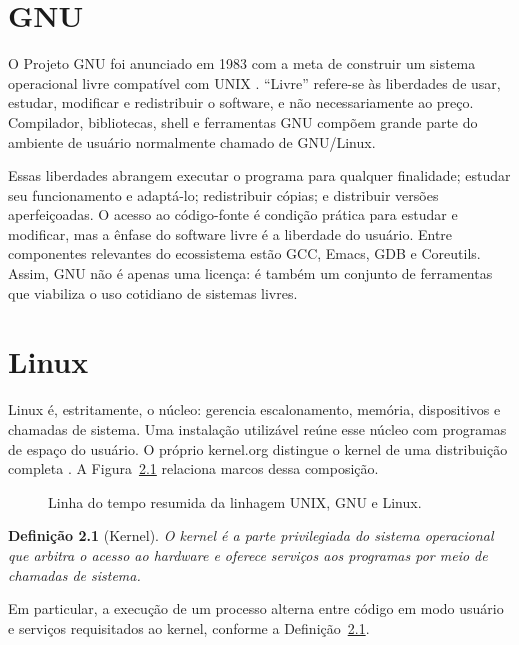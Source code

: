 \documentclass[12pt,openright,oneside,a4paper,brazil]{abntex2}
\newtheorem{definicao}{Definição}[chapter]
\begin{document}
\chapter{GNU}\label{chap:gnu}
O Projeto GNU foi anunciado em 1983 com a meta de construir um sistema operacional livre compatível com UNIX \cite{gnuabout}. ``Livre'' refere-se às liberdades de usar, estudar, modificar e redistribuir o software, e não necessariamente ao preço. Compilador, bibliotecas, shell e ferramentas GNU compõem grande parte do ambiente de usuário normalmente chamado de GNU/Linux.

Essas liberdades abrangem executar o programa para qualquer finalidade; estudar seu funcionamento e adaptá-lo; redistribuir cópias; e distribuir versões aperfeiçoadas. O acesso ao código-fonte é condição prática para estudar e modificar, mas a ênfase do software livre é a liberdade do usuário. Entre componentes relevantes do ecossistema estão GCC, Emacs, GDB e Coreutils. Assim, GNU não é apenas uma licença: é também um conjunto de ferramentas que viabiliza o uso cotidiano de sistemas livres.

\chapter{Linux}\label{chap:linux}
Linux é, estritamente, o núcleo: gerencia escalonamento, memória, dispositivos e chamadas de sistema. Uma instalação utilizável reúne esse núcleo com programas de espaço do usuário. O próprio kernel.org distingue o kernel de uma distribuição completa \cite{kernelabout}. A Figura~\ref{fig:timeline} relaciona marcos dessa composição.
\begin{figure}[htbp]\centering
{}
\caption{Linha do tempo resumida da linhagem UNIX, GNU e Linux.}\label{fig:timeline}
\end{figure}
\begin{definicao}[Kernel]\label{def:kernel}
O kernel é a parte privilegiada do sistema operacional que arbitra o acesso ao hardware e oferece serviços aos programas por meio de chamadas de sistema.
\end{definicao}
Em particular, a execução de um processo alterna entre código em modo usuário e serviços requisitados ao kernel, conforme a Definição~\ref{def:kernel}.
\end{document}
